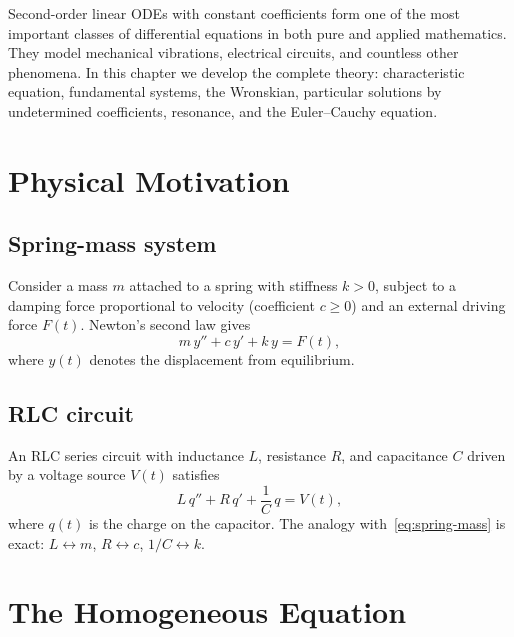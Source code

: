 \documentclass[12pt,a4paper,openany]{book}
\theoremstyle{definition}
\theoremstyle{plain}
\theoremstyle{remark}
\begin{document}
Second-order linear ODEs with constant coefficients form one of the most
important classes of differential equations in both pure and applied
mathematics. They model mechanical vibrations, electrical circuits, and
countless other phenomena. In this chapter we develop the complete theory:
characteristic equation, fundamental systems, the Wronskian, particular
solutions by undetermined coefficients, resonance, and the Euler--Cauchy
equation.

\section{Physical Motivation}\label{sec:physical-motivation}

\subsection{Spring-mass system}

Consider a mass $m$ attached to a spring with stiffness $k > 0$, subject to
a damping force proportional to velocity (coefficient $c \ge 0$) and an
external driving force $F(t)$. Newton's second law gives
\begin{equation}\label{eq:spring-mass}
  m\,y'' + c\,y' + k\,y = F(t),
\end{equation}
where $y(t)$ denotes the displacement from equilibrium.

\subsection{RLC circuit}

An RLC series circuit with inductance $L$, resistance $R$, and capacitance $C$
driven by a voltage source $V(t)$ satisfies
\begin{equation}\label{eq:rlc}
  L\,q'' + R\,q' + \frac{1}{C}\,q = V(t),
\end{equation}
where $q(t)$ is the charge on the capacitor. The analogy with~\eqref{eq:spring-mass}
is exact: $L \leftrightarrow m$, $R \leftrightarrow c$,
$1/C \leftrightarrow k$.

\section{The Homogeneous Equation}\label{sec:homogeneous-2nd}
\end{document}
